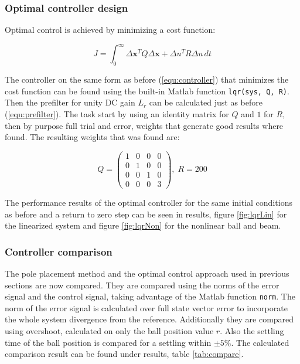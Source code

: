 \documentclass[a4paper, titlepage]{article}
\begin{document}
\subsubsection{Optimal controller design}
Optimal control is achieved by minimizing a cost function:

\begin{equation}
J = \int_0^{\infty} \Delta \textbf{x}^TQ\Delta \textbf{x} + \Delta u^TR\Delta u\,dt
\end{equation}

The controller on the same form as before (\ref{equ:controller}) that minimizes the cost function can be found using the built-in Matlab function \verb|lqr(sys, Q, R)|.
Then the prefilter for unity DC gain $L_r$ can be calculated just as before (\ref{equ:prefilter}).
The task start by using an identity matrix for $Q$ and $1$ for $R$, then by purpose full trial and error, weights that generate good results where found.
The resulting weights that was found are:

\begin{equation}
Q = \begin{pmatrix}
1 & 0 & 0 & 0 \\
0 & 1 & 0 & 0 \\
0 & 0 & 1 & 0 \\
0 & 0 & 0 & 3
\end{pmatrix}, \; 
R = 200
\end{equation}

The performance results of the optimal controller for the same initial conditions as before and a return to zero step can be seen in results, figure \ref{fig:lqrLin} for the linearized system and figure \ref{fig:lqrNon} for the nonlinear ball and beam.

\subsubsection{Controller comparison}
The pole placement method and the optimal control approach used in previous sections are now compared.
They are compared using the norms of the error signal and the control signal, taking advantage of the Matlab function \verb|norm|.
The norm of the error signal is calculated over full state vector error to incorporate the whole system divergence from the reference.
Additionally they are compared using overshoot, calculated on only the ball position value $r$.
Also the settling time of the ball position is compared for a settling within $\pm5\%$.
The calculated comparison result can be found under results, table \ref{tab:compare}.
\end{document}
